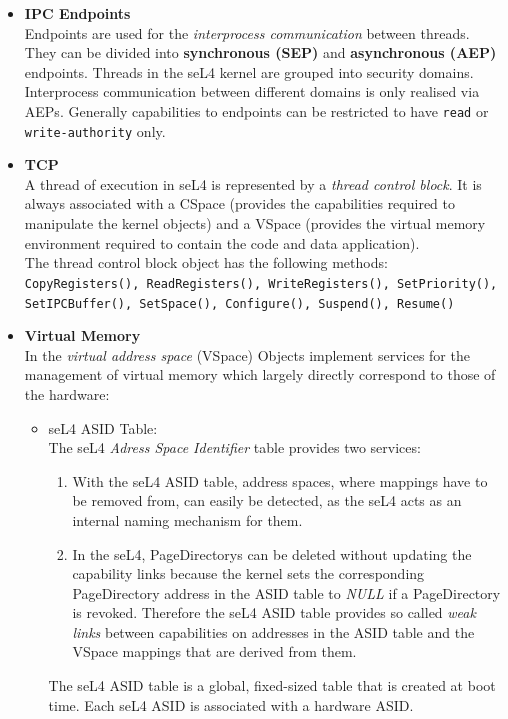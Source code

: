 \begin{itemize}
\item \textbf{IPC Endpoints} \\
Endpoints are used for the \textit{interprocess communication} between threads. They can be divided into \textbf{synchronous (SEP)} and \textbf{asynchronous (AEP)} endpoints. 
Threads in the seL4 kernel are grouped into security domains. Interprocess communication between different domains is only realised via AEPs. Generally capabilities to endpoints can be restricted to have \texttt{read} or \texttt{write-authority} only. 
\item \textbf{TCP} \\
A thread of execution in seL4 is represented by a \textit{thread control block}. It is always associated with a CSpace (provides the capabilities required to manipulate the kernel objects) and a VSpace (provides the virtual memory environment required to contain the code and data application). \\
The thread control block object has the following methods: \\
\texttt{CopyRegisters(), ReadRegisters(), WriteRegisters(), SetPriority(), \\ SetIPCBuffer(), SetSpace(), Configure(), Suspend(), Resume()}
\item \textbf{Virtual Memory}\\
In the \textit{virtual address space} (VSpace) Objects implement services for the management of virtual memory which largely directly correspond to those of the hardware: \\
\begin{itemize}
\item seL4 ASID Table: \\
The seL4 \textit{Adress Space Identifier} table provides two services:
\begin{enumerate}
\item With the seL4 ASID table, address spaces, where mappings have to be removed from, can easily be detected, as the seL4 acts as an internal naming mechanism for them.
\item In the seL4, PageDirectorys can be deleted without updating the capability links because the kernel sets the corresponding PageDirectory address in the ASID table to \textit{NULL} if a PageDirectory is revoked. Therefore the seL4 ASID table provides so called \textit{weak links} between capabilities on addresses in the ASID table and the VSpace mappings that are derived from them.
\end{enumerate}
The seL4 ASID table is a global, fixed-sized table that is created at boot time. Each seL4 ASID is associated with a hardware ASID.

\end{itemize}
\end{itemize}
